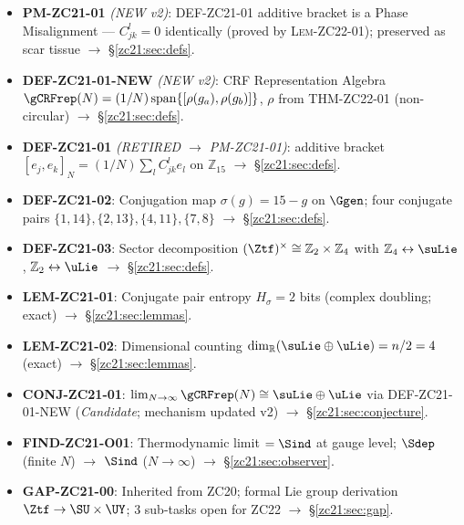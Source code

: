 \documentclass[12pt, a4paper]{article}
\begin{document}
\begin{formalbox}[title={Atomic Units Introduced by TASK-ZC21 v2 (10 units)}]
\begin{itemize}[leftmargin=*, noitemsep]
  \item \textbf{PM-ZC21-01} \emph{(NEW v2)}: DEF-ZC21-01 additive bracket
    is a Phase Misalignment — $C_{jk}^l = 0$ identically
    (proved by \textsc{Lem-ZC22-01}); preserved as scar tissue
    $\to$ \S\ref{zc21:sec:defs}.
  \item \textbf{DEF-ZC21-01-NEW} \emph{(NEW v2)}: CRF Representation Algebra
    $\gCRFrep(N) = (1/N)\,\mathrm{span}\{[\rho(g_a),\rho(g_b)]\}$,
    $\rho$ from THM-ZC22-01 (non-circular)
    $\to$ \S\ref{zc21:sec:defs}.
  \item \textbf{DEF-ZC21-01} \emph{(RETIRED $\to$ PM-ZC21-01)}: additive bracket
    $[e_j,e_k]_N = (1/N)\sum_l C_{jk}^l e_l$ on $\mathbb{Z}_{15}$
    $\to$ \S\ref{zc21:sec:defs}.
  \item \textbf{DEF-ZC21-02}: Conjugation map $\sigma(g)=15-g$ on $\Ggen$;
    four conjugate pairs $\{1,14\},\{2,13\},\{4,11\},\{7,8\}$
    $\to$ \S\ref{zc21:sec:defs}.
  \item \textbf{DEF-ZC21-03}: Sector decomposition
    $(\Ztf)^\times \cong \mathbb{Z}_2\times\mathbb{Z}_4$
    with $\mathbb{Z}_4 \leftrightarrow \suLie$, $\mathbb{Z}_2 \leftrightarrow \uLie$
    $\to$ \S\ref{zc21:sec:defs}.
  \item \textbf{LEM-ZC21-01}: Conjugate pair entropy $H_\sigma = 2$ bits
    (complex doubling; exact)
    $\to$ \S\ref{zc21:sec:lemmas}.
  \item \textbf{LEM-ZC21-02}: Dimensional counting
    $\dim_\mathbb{R}(\suLie\oplus\uLie) = n/2 = 4$ (exact)
    $\to$ \S\ref{zc21:sec:lemmas}.
  \item \textbf{CONJ-ZC21-01}: $\lim_{N\to\infty}\gCRFrep(N)\cong\suLie\oplus\uLie$
    via DEF-ZC21-01-NEW (\emph{Candidate}; mechanism updated v2)
    $\to$ \S\ref{zc21:sec:conjecture}.
  \item \textbf{FIND-ZC21-O01}: Thermodynamic limit $= \Sind$ at gauge level;
    $\Sdep$ (finite $N$) $\to$ $\Sind$ ($N\to\infty$)
    $\to$ \S\ref{zc21:sec:observer}.
  \item \textbf{GAP-ZC21-00}: Inherited from ZC20;
    formal Lie group derivation $\Ztf\to\SU\times\UY$;
    3 sub-tasks open for ZC22
    $\to$ \S\ref{zc21:sec:gap}.
\end{itemize}
\end{formalbox}

\end{document}
